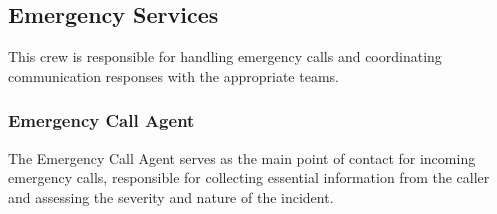\subsection{Emergency Services}

This crew is responsible for handling emergency calls and coordinating communication responses with the appropriate teams.

\subsubsection{Emergency Call Agent}

The Emergency Call Agent serves as the main point of contact for incoming emergency calls, responsible for collecting essential information from the caller and assessing the severity and nature of the incident.

